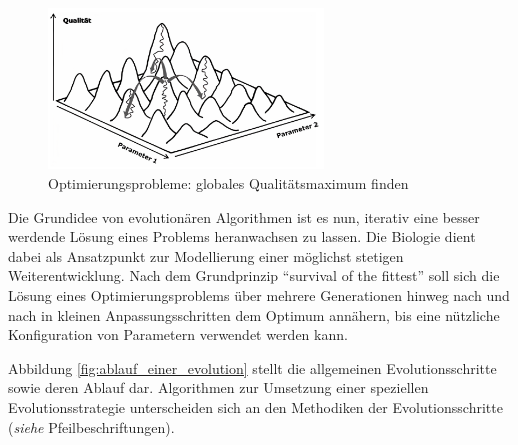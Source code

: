 \begin{figure}[H]
\centering
\includegraphics[width=0.65\textwidth]{img/Evolutionsstrategie_lokale_globale_Maxima.png}
\caption[Optimierungsprobleme: lokale Maxima/Minima finden]{Optimierungsprobleme: globales Qualitätsmaximum finden\protect\footnotemark}
\label{fig:lokale_globale_maxima}
\end{figure}

Die Grundidee von evolutionären Algorithmen ist es nun, iterativ eine besser werdende Lösung eines Problems heranwachsen zu lassen.
Die Biologie dient dabei als Ansatzpunkt zur Modellierung einer möglichst stetigen Weiterentwicklung.
Nach dem Grundprinzip \enquote{survival of the fittest} soll sich die Lösung eines Optimierungsproblems über mehrere Generationen hinweg nach und nach in kleinen Anpassungsschritten dem Optimum annähern, bis eine nützliche Konfiguration von Parametern verwendet werden kann.

Abbildung \ref{fig:ablauf_einer_evolution} stellt die allgemeinen Evolutionsschritte sowie deren Ablauf dar.
Algorithmen zur Umsetzung einer speziellen Evolutionsstrategie unterscheiden sich an den Methodiken der Evolutionsschritte (\textit{siehe} Pfeilbeschriftungen).

